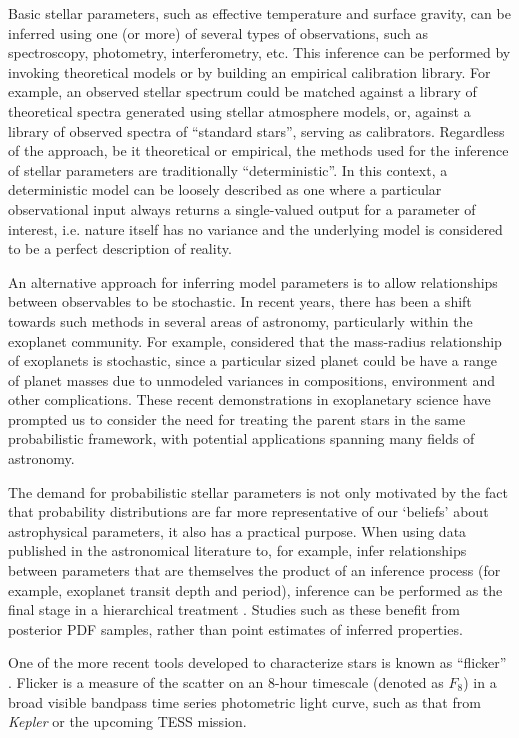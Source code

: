 Basic stellar parameters, such as effective temperature and surface gravity,
can be inferred using one (or more) of several types of observations, such as
spectroscopy, photometry, interferometry, etc. This inference can be performed
by invoking theoretical models or by building an empirical calibration
library.
For example, an observed stellar spectrum could be matched against a library of
theoretical spectra generated using stellar atmosphere models, or, against a
library of observed spectra of ``standard stars'', serving as calibrators.
Regardless of the approach, be it theoretical or empirical, the methods used
for the inference of stellar parameters are traditionally ``deterministic''.
In this context, a deterministic model can be loosely described as one where
a particular observational input always returns a single-valued output for a
parameter of interest, i.e. nature itself has no variance and the underlying
model is considered to be a perfect description of reality.

An alternative approach for inferring model parameters is to allow
relationships between observables to be stochastic.
In recent years, there has been a shift towards such methods in several areas
of astronomy, particularly within the exoplanet community.
For example, \citet{Wolfgang2015} considered that the mass-radius
relationship of exoplanets is stochastic, since a particular sized planet
could be have a range of planet masses due to unmodeled variances in
compositions, environment and other complications.
These recent demonstrations in exoplanetary science have prompted us to
consider the need for treating the parent stars in the same probabilistic
framework, with potential applications spanning many fields of astronomy.

The demand for probabilistic stellar parameters is not only motivated by the
fact that probability distributions are far more representative of our
`beliefs' about astrophysical parameters, it also has a practical purpose.
When using data published in the astronomical literature to, for example,
infer relationships between parameters that are themselves the product of an
inference process (for example, exoplanet transit depth and period), inference
can be performed as the final stage in a hierarchical treatment \citep[see,
e.g.][]{Foreman-Mackey2014}.
Studies such as these benefit from posterior PDF samples, rather than
point estimates of inferred properties.

One of the more recent tools developed to characterize stars is known as
``flicker'' \citep{Bastien2013}.
Flicker is a measure of the scatter on an 8-hour timescale (denoted as $F_8$)
in a broad visible bandpass time series photometric light curve, such as that
from \textit{Kepler} or the upcoming TESS mission.

